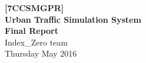 \begin{titlepage}
    \begin{center}
        \vspace*{6cm}
        \noindent\makebox[\linewidth]{\rule{\paperwidth}{0.4pt}}
        \Huge
        \textbf{[7CCSMGPR]\\Urban Traffic Simulation System\\}
        \vspace{0.5cm}
        \Large
        \textbf{Final Report\\}
        \vspace{1.5cm}
        \large
        \textsf{Index\_Zero team\\}
        \vspace{1cm}
        \textsf{Thursday  May 2016}
        \noindent\makebox[\linewidth]{\rule{\paperwidth}{0.4pt}}
        \vfill
	\end{center}
	\vspace{1cm}
\end{titlepage}